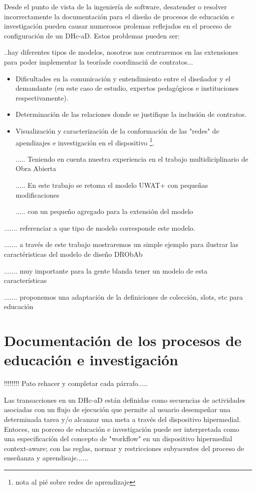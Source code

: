 \documentclass{llncs}
\begin{document}
Desde el punto de vista de la ingeniería de software, desatender o resolver incorrectamente la documentación para el diseño de procesos de educación e investigación pueden causar numerosos prolemas reflejados en el proceso de configuración  de un DHc-aD. Estos problemas pueden ser:


..hay diferentes tipos de modelos, nosotros nos centraremos en las extensiones para poder implementar la teoríade coordinaciń de contratos...
\begin{itemize}


 \item Dificultades en la comunicación y entendimiento entre el diseñador y el demandante (en este caso de estudio, expertos pedagógicos e instituciones respectivamente).
 \item Determinación de las relaciones donde se justifique la inclusión de contratos. 
 \item Visualización y caracterización de la conformación de las "redes" de apendizajes e investigación en el dispositivo \footnote{ nota al pié sobre redes de aprendizaje}.


..... Teniendo en cuenta nuestra experiencia en el trabajo multidiciplinario de Obra Abierta

..... En este trabajo se retoma el modelo UWAT+ con pequeñas modificaciones 

..... con un pequeño agregado para la extensión del modelo 



\end{itemize}


....... referenciar a que tipo de modelo corresponde este modelo.

.......  a través de este trabajo mostraremos un simple ejemplo para ilustrar las caractéristicas del modelo de diseño DRObAb 

.......  muy importante para la gente blanda tener un modelo de esta características

....... proponemos una adaptación de la definiciones de colección, slots, etc para educación 

\section{Documentación de los procesos de educación e investigación}


!!!!!!!! Pato rehacer y completar cada párrafo.....


Las transacciones en un DHc-aD están definidas como secuencias de actividades asociadas con un flujo de ejecución que permite al usuario desempeñar una determinada tarea  y/o alcanzar una meta a través del dispositivo hipermedial. Entoces, un porceso de educación e investigación puede ser interpretada como una especificación del concepto de "workflow" en un dispositivo hipermedial context-aware; con las reglas, normar y restricciones  subyacentes del proceso de enseñanza y aprendisaje......
\end{document}
